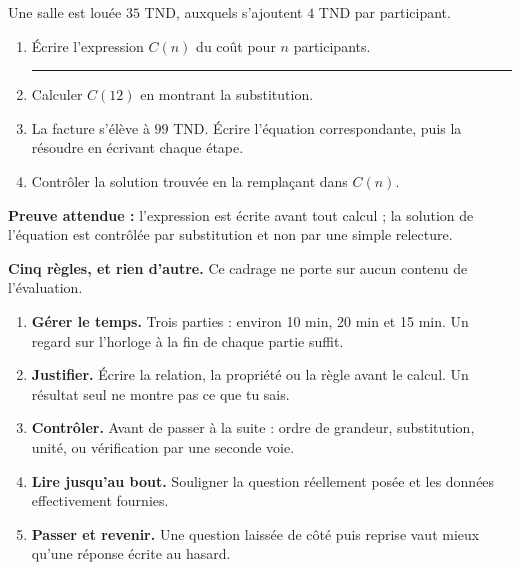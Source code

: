 \documentclass[10pt,a4paper]{article}
\begin{document}
Une salle est louée $35$ TND, auxquels s'ajoutent $4$ TND par participant.
\begin{enumerate}
\item Écrire l'expression $C(n)$ du coût pour $n$ participants. \rule{60mm}{0.32pt}
\item Calculer $C(12)$ en montrant la substitution.
\item La facture s'élève à $99$ TND. Écrire l'équation correspondante, puis la résoudre en écrivant chaque étape.
\item Contrôler la solution trouvée en la remplaçant dans $C(n)$.
\end{enumerate}

\begin{successbox}
\textbf{Preuve attendue :} l'expression est écrite avant tout calcul ; la solution de l'équation est
contrôlée par substitution et non par une simple relecture.
\end{successbox}

\needspace{62mm}\par\vspace{3mm}

\begin{methodbox}
\textbf{Cinq règles, et rien d'autre.} Ce cadrage ne porte sur aucun contenu de l'évaluation.
\begin{enumerate}
\item \textbf{Gérer le temps.} Trois parties : environ 10 min, 20 min et 15 min. Un regard sur l'horloge à la fin de chaque partie suffit.
\item \textbf{Justifier.} Écrire la relation, la propriété ou la règle avant le calcul. Un résultat seul ne montre pas ce que tu sais.
\item \textbf{Contrôler.} Avant de passer à la suite : ordre de grandeur, substitution, unité, ou vérification par une seconde voie.
\item \textbf{Lire jusqu'au bout.} Souligner la question réellement posée et les données effectivement fournies.
\item \textbf{Passer et revenir.} Une question laissée de côté puis reprise vaut mieux qu'une réponse écrite au hasard.
\end{enumerate}
\end{methodbox}
\end{document}
